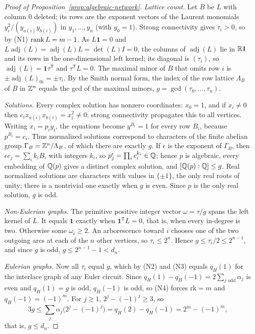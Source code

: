\begin{proof}[Proof of Proposition~\ref{prop:algebraic-network}]
\emph{Lattice count.} Let $B$ be $L$ with column $0$ deleted; its rows are the
exponent vectors of the Laurent monomials $y_i^2/(y_{a(i)}y_{b(i)})$ in
$y_1,\ldots,y_n$ (with $y_0=1$). Strong connectivity gives $\tau_i>0$, so by
(N1) $\operatorname{rank} L=m-1$. As $L\mathbf1=0$ and
$L\operatorname{adj}(L)=\operatorname{adj}(L)L=\det(L)I=0$, the columns of
$\operatorname{adj}(L)$ lie in $\mathbb R\mathbf1$ and its rows in the
one-dimensional left kernel; its diagonal is $(\tau_i)$, so
$\operatorname{adj}(L)=\mathbf1\tau^{\mathsf T}$ and $\tau^{\mathsf T}L=0$. The
maximal minor of $B$ that omits row $i$ is $\pm\operatorname{adj}(L)_{0i}=
\pm\tau_i$. By the Smith normal form, the index of the row lattice
$\Lambda_B$ of $B$ in $\mathbb Z^n$ equals the gcd of the maximal minors,
$g=\gcd(\tau_0,\ldots,\tau_n)$.

\emph{Solutions.} Every complex solution has nonzero coordinates: $x_0=1$,
and if $x_i\ne0$ then $c_ix_{a(i)}x_{b(i)}=x_i^2\ne0$; strong connectivity
propagates this to all vertices. Writing $x_i=p_iy_i$, the equations become
$y^{B_i}=1$ for every row $B_i$, because $p^{B_i}=c_i$. Thus normalized
solutions correspond to characters of the finite abelian group
$\Gamma_B=\mathbb Z^n/\Lambda_B$, of which there are exactly $g$. If $\epsilon$ is the
exponent of $\Gamma_B$, then $\epsilon e_j=\sum_ik_iB_i$ with integers $k_i$,
so $p_j^\epsilon=\prod_ic_i^{k_i}\in\mathbb Q$; hence $p$ is algebraic, every
embedding of $\mathbb Q(p)$ gives a distinct complex solution, and
$[\mathbb Q(p):\mathbb Q]\le g$. Real normalized solutions are characters with values in
$\{\pm1\}$, the only real roots of unity; there is a nontrivial one exactly
when $g$ is even. Since $p$ is the only real solution, $g$ is odd.

\emph{Non-Eulerian graphs.} The primitive positive integer vector
$\omega=\tau/g$ spans the left kernel of $L$. It equals $\mathbf1$ exactly when
$\mathbf1^{\mathsf T}L=0$, that is, when every in-degree is two. Otherwise some
$\omega_i\ge2$. An arborescence toward $i$ chooses one of the two outgoing arcs
at each of the $n$ other vertices, so $\tau_i\le2^n$. Hence
$g\le\tau_i/2\le2^{n-1}$, and since $g$ is odd, $g\le2^{n-1}-1<d_n$.

\emph{Eulerian graphs.} Now all $\tau_i$ equal $g$, which by (N2) and (N3)
equals $q_H(1)$ for the interlace graph of any Euler circuit. Since
$q_H(1)-q_H(-1)=2\sum_{j\text{ odd}}\alpha_j$ is even and $q_H(1)=g$ is odd,
$q_H(-1)$ is odd, so (N4) forces $\mathrm{rk}=m$ and $q_H(-1)=(-1)^m$. For
$j\ge1$, $2^j-(-1)^j\ge3$, so
\[
 3g\le\sum_j\alpha_j\bigl(2^j-(-1)^j\bigr)=q_H(2)-q_H(-1)=2^m-(-1)^m,
\]
that is, $g\le d_n$.


\end{proof}
